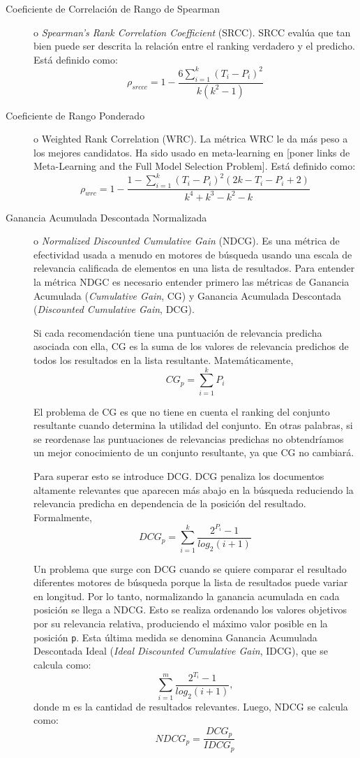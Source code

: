\begin{description}
	\item[Coeficiente de Correlación de Rango de Spearman]o \textit{Spearman’s Rank Correlation Coefficient} (SRCC). SRCC evalúa que tan  bien puede ser descrita la relación entre el ranking verdadero y el predicho. Está definido como: $$\rho_{srccc} = 1 - \dfrac{6\sum^k_{i=1}(T_i - P_i)^2}{k(k^2-1)}$$
	
	\item[Coeficiente de Rango Ponderado]o Weighted Rank Correlation (WRC). La métrica WRC le da más peso a los mejores candidatos. Ha sido usado en meta-learning en [poner links de Meta-Learning and the Full Model Selection Problem]. Está definido como: $$\rho_{wrc} = 1 - \dfrac{1-\sum^k_{i=1} (T_i - P_i)^2(2k - T_i - P_i + 2) }{k ^4+k^3-k^2-k}$$
	
	\item[Ganancia Acumulada Descontada Normalizada]o \textit{Normalized Discounted Cumulative Gain} (NDCG). Es una métrica de efectividad usada a menudo en motores de búsqueda usando una escala de relevancia calificada de elementos en una lista de resultados. Para entender la métrica NDGC es necesario entender primero las métricas de Ganancia Acumulada (\textit{Cumulative Gain}, CG) y Ganancia Acumulada Descontada (\textit{Discounted Cumulative Gain}, DCG).
	
	Si cada recomendación tiene una puntuación de relevancia predicha asociada con ella, CG es la suma de los valores de relevancia predichos de todos los resultados en la lista resultante. Matemáticamente, $$CG_p = \sum^k_{i=1}P_i$$
	
	El problema de CG es que no tiene en cuenta el ranking del conjunto resultante cuando determina la utilidad del conjunto. En otras palabras, si se reordenase las puntuaciones de relevancias predichas no obtendríamos un mejor conocimiento de un conjunto resultante, ya que CG no cambiará.
	
	Para superar esto se introduce DCG. DCG penaliza los documentos altamente relevantes que aparecen más abajo en la búsqueda reduciendo la relevancia predicha en dependencia de la posición del resultado. Formalmente, $$DCG_p = \sum^k_{i=1} \dfrac{2^{P_i} - 1}{log_2(i + 1)}$$
	
	Un problema que surge con DCG cuando se quiere comparar el resultado diferentes motores de búsqueda porque la lista de resultados puede variar en longitud. Por lo tanto, normalizando la ganancia acumulada en cada posición se llega a NDCG. Esto se realiza ordenando los valores objetivos por su relevancia relativa, produciendo el máximo valor posible en la posición \texttt{p}. Esta última medida se denomina Ganancia Acumulada Descontada Ideal (\textit{Ideal Discounted Cumulative Gain}, IDCG), que se calcula como: $$\sum^m_{i=1} \dfrac{2^{T_i} - 1}{log_2(i+1)}, $$ donde m es la cantidad de resultados relevantes.
	Luego, NDCG se calcula como: $$NDCG_p = \frac{DCG_p}{IDCG_p}$$
\end{description}

